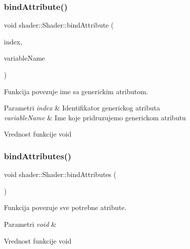 \subsubsection{\texorpdfstring{bind\+Attribute()}{bindAttribute()}}
{\footnotesize\ttfamily void shader\+::\+Shader\+::bind\+Attribute (\begin{DoxyParamCaption}\item[{int}]{index,  }\item[{const char $\ast$}]{variable\+Name }\end{DoxyParamCaption})}



Funkcija povezuje ime sa generickim atributom. 


\begin{DoxyParams}{Parametri}
{\em index} & Identifikator generickog atributa \\
\hline
{\em variable\+Name} & Ime koje pridruzujemo generickom atributu \\
\hline
\end{DoxyParams}
\begin{DoxyReturn}{Vrednost funkcije}
void 
\end{DoxyReturn}
\mbox{\label{classshader_1_1Shader_a0b80abf1266063b5b2dea30422dd3358}} 
\subsubsection{\texorpdfstring{bind\+Attributes()}{bindAttributes()}}
{\footnotesize\ttfamily void shader\+::\+Shader\+::bind\+Attributes (\begin{DoxyParamCaption}\item[{void}]{ }\end{DoxyParamCaption})}



Funkcija povezuje sve potrebne atribute. 


\begin{DoxyParams}{Parametri}
{\em void} & \\
\hline
\end{DoxyParams}
\begin{DoxyReturn}{Vrednost funkcije}
void 
\end{DoxyReturn}
\mbox{\label{classshader_1_1Shader_af79c5615b39eae7e6368508429645c33}} 
